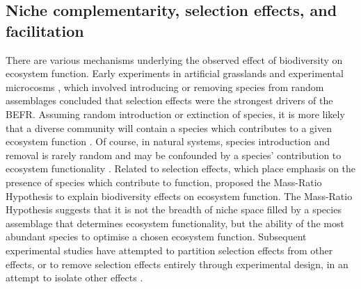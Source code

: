 \begin{refsection}
\subsection{Niche complementarity, selection effects, and facilitation}
\label{background:ssec:niche}

There are various mechanisms underlying the observed effect of biodiversity on ecosystem function. Early experiments in artificial grasslands \citep{Tilman1994} and experimental microcosms \citep{Naeem1994}, which involved introducing or removing species from random assemblages concluded that selection effects were the strongest drivers of the BEFR. Assuming random introduction or extinction of species, it is more likely that a diverse community will contain a species which contributes to a given ecosystem function \citep{Huston1997}. Of course, in natural systems, species introduction and removal is rarely random and may be confounded by a species' contribution to ecosystem functionality \citep{Smith2003}. Related to selection effects, which place emphasis on the presence of species which contribute to function, \citet{Grime1998} proposed the Mass-Ratio Hypothesis to explain biodiversity effects on ecosystem function. The Mass-Ratio Hypothesis suggests that it is not the breadth of niche space filled by a species assemblage that determines ecosystem functionality, but the ability of the most abundant species to optimise a chosen ecosystem function. Subsequent experimental studies have attempted to partition selection effects from other effects, or to remove selection effects entirely through experimental design, in an attempt to isolate other effects \citep{Loreau2001a}.


\end{refsection}
